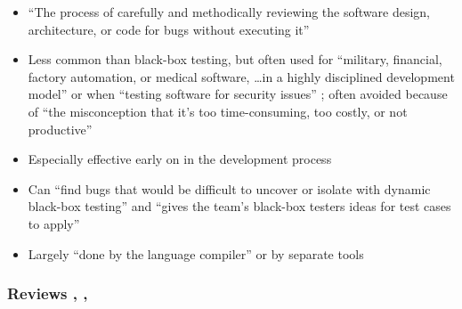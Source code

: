 \begin{itemize}
      \item ``The process of carefully and methodically reviewing the software
            design, architecture, or code for bugs without executing it''
            \citep[p.~92]{Patton2006}
      \item Less common than black-box testing, but often used for ``military,
            financial, factory automation, or medical software, \dots in a
            highly disciplined development model'' or when ``testing software
            for security issues'' \citep[p.~91]{Patton2006}; often
            avoided because of ``the misconception that it's too
            time-consuming, too costly, or not productive''
            \citep[p.~92]{Patton2006}
      \item Especially effective early on in the development process
            \citep[p.~92]{Patton2006}
      \item Can ``find bugs that would be difficult to uncover or isolate with
            dynamic black-box testing'' and ``gives the team's black-box
            testers ideas for test cases to apply''
            \citep[p.~92]{Patton2006}
      \item Largely ``done by the language compiler'' or by separate tools
            \citep[pp.~413-414]{vanVliet2000}
\end{itemize}

\subsubsection{Reviews \citep[pp.~92-95]{Patton2006},
      \citep[pp.~415-417]{vanVliet2000},
      \citep[pp.~482-485]{PetersAndPedrycz2000}}
\label{reviews}

